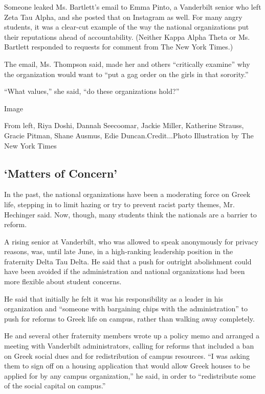 Someone leaked Ms. Bartlett's email to Emma Pinto, a Vanderbilt senior
who left Zeta Tau Alpha, and she posted that on Instagram as well. For
many angry students, it was a clear-cut example of the way the national
organizations put their reputations ahead of accountability. (Neither
Kappa Alpha Theta or Ms. Bartlett responded to requests for comment from
The New York Times.)

The email, Ms. Thompson said, made her and others ``critically examine''
why the organization would want to ``put a gag order on the girls in
that sorority.''

``What values,'' she said, ``do these organizations hold?''

Image

From left, Riya Doshi, Dannah Seecoomar, Jackie Miller, Katherine
Strauss, Gracie Pitman, Shane Ausmus, Edie Duncan.Credit...Photo
Illustration by The New York Times

\hypertarget{matters-of-concern}{%
\subsection{`Matters of Concern'}\label{matters-of-concern}}

In the past, the national organizations have been a moderating force on
Greek life, stepping in to limit hazing or try to prevent racist party
themes, Mr. Hechinger said. Now, though, many students think the
nationals are a barrier to reform.

A rising senior at Vanderbilt, who was allowed to speak anonymously for
privacy reasons, was, until late June, in a high-ranking leadership
position in the fraternity Delta Tau Delta. He said that a push for
outright abolishment could have been avoided if the administration and
national organizations had been more flexible about student concerns.

He said that initially he felt it was his responsibility as a leader in
his organization and ``someone with bargaining chips with the
administration'' to push for reforms to Greek life on campus, rather
than walking away completely.

He and several other fraternity members wrote up a policy memo and
arranged a meeting with Vanderbilt administrators, calling for reforms
that included a ban on Greek social dues and for redistribution of
campus resources. ``I was asking them to sign off on a housing
application that would allow Greek houses to be applied for by any
campus organization,'' he said, in order to ``redistribute some of the
social capital on campus.''

